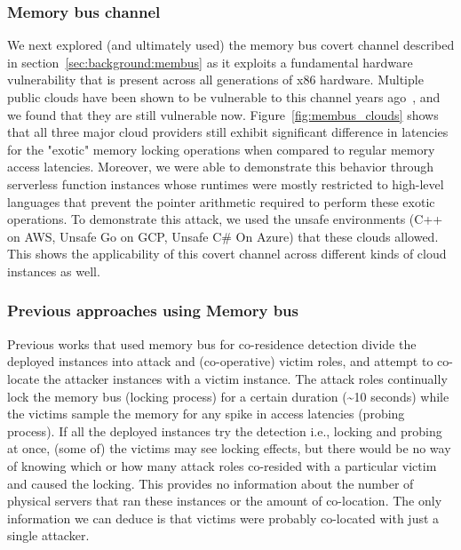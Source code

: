 \subsubsection{Memory bus channel}
We next explored (and ultimately used) the memory bus covert channel 
described in section~\ref{sec:background:membus} as it exploits a fundamental hardware 
vulnerability that is present across all generations of x86 hardware. 
Multiple public clouds have been shown to be 
vulnerable  to this channel years ago~\cite{varad191016,compstudycoresidency}, 
and we found that they 
are still vulnerable now. Figure~\ref{fig:membus_clouds} shows that all three major cloud providers 
still exhibit significant difference in latencies for the "exotic" memory locking operations when
compared to regular memory access latencies. Moreover, we were able to demonstrate this behavior 
through serverless
function instances whose runtimes were mostly restricted to high-level languages that 
prevent the pointer arithmetic required to perform these exotic operations. 
To demonstrate this attack, we used 
the unsafe environments (C++ on AWS, Unsafe Go on GCP, Unsafe C\# On Azure) that these 
clouds allowed.  This shows the applicability of this covert 
channel across different kinds of cloud instances as well.

\subsubsection{Previous approaches using Memory bus}
Previous works that used memory bus for co-residence 
detection divide the deployed instances into 
attack and (co-operative) victim roles, and attempt to 
co-locate the attacker instances with a victim instance. The attack roles
continually lock the memory bus (locking process) for a 
certain duration (\textasciitilde 10 seconds) while the victims sample the 
memory for any spike in access latencies (probing process). 
If all the deployed instances try the detection i.e., locking and probing
at once, (some of) the victims may see locking effects, but there would be no way of
knowing which or how many attack roles co-resided with a particular victim and 
caused the locking. This provides no information about the number of physical servers 
that ran these instances or the amount of co-location. The only information 
we can deduce is that victims were probably co-located with just a single attacker.

